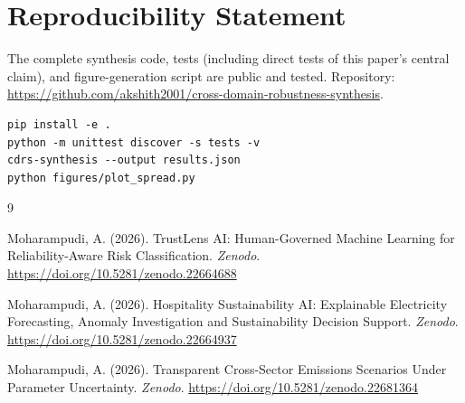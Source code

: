 \documentclass[11pt]{article}
\begin{document}
\section*{Reproducibility Statement}

The complete synthesis code, tests (including direct tests of this paper's central claim), and figure-generation script are public and tested. Repository: \url{https://github.com/akshith2001/cross-domain-robustness-synthesis}.

\begin{verbatim}
pip install -e .
python -m unittest discover -s tests -v
cdrs-synthesis --output results.json
python figures/plot_spread.py
\end{verbatim}

\begin{thebibliography}{9}

Moharampudi, A. (2026). TrustLens AI: Human-Governed Machine Learning for Reliability-Aware Risk Classification. \textit{Zenodo}. \url{https://doi.org/10.5281/zenodo.22664688}

Moharampudi, A. (2026). Hospitality Sustainability AI: Explainable Electricity Forecasting, Anomaly Investigation and Sustainability Decision Support. \textit{Zenodo}. \url{https://doi.org/10.5281/zenodo.22664937}

Moharampudi, A. (2026). Transparent Cross-Sector Emissions Scenarios Under Parameter Uncertainty. \textit{Zenodo}. \url{https://doi.org/10.5281/zenodo.22681364}

\end{thebibliography}
\end{document}

